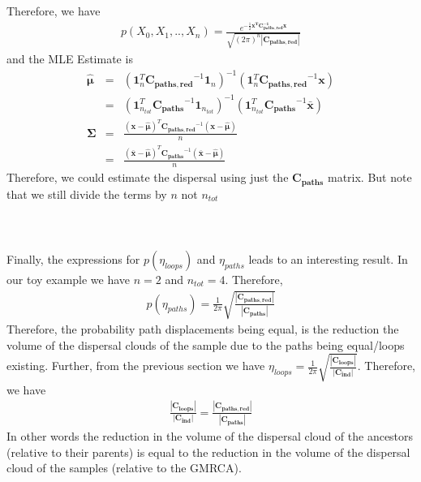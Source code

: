 Therefore, we have 
\begin{eqnarray*}
    p(X_0,X_1,..,X_n) = \frac{e^{ -\frac{1}{2} \mathbf{x^TC_{paths,red}^{-1}x} }}{\sqrt{(2\pi)^n |\mathbf{C_{paths,red}}| }}
\end{eqnarray*}
and the MLE Estimate is 
\begin{eqnarray*}
\boldsymbol{\hat{\mu}} &=& (\mathbf{1}_n^T\mathbf{C_{paths,red}}^{-1}\mathbf{1}_n)^{-1} ( \mathbf{1}_n^T\mathbf{C_{paths,red}}^{-1}\mathbf{x} ) \\ &=& (\mathbf{1}_{n_{tot}}^T\mathbf{C_{paths}}^{-1}\mathbf{1}_{n_{tot}})^{-1} ( \mathbf{1}_{n_{tot}}^T\mathbf{C_{paths}}^{-1}\mathbf{\bar{x}} )  \\
\boldsymbol{\Sigma} &=& \frac{(\mathbf{x} - \boldsymbol{\hat{\mu}} )^T \mathbf{C_{paths,red}}^{-1} (\mathbf{x} - \boldsymbol{\hat{\mu}} )}{n} \\
&=& \frac{(\mathbf{\bar{x}} - \boldsymbol{\hat{\mu}} )^T \mathbf{C_{paths}}^{-1} (\mathbf{\bar{x}} - \boldsymbol{\hat{\mu}} )}{n}
\end{eqnarray*}
Therefore, we could estimate the dispersal using just the $\mathbf{C_{paths}}$ matrix. But note that we still divide the terms by $n$ not $n_{tot}$ \\ \\ \\ \\
Finally, the expressions for $p(\eta_{loops})$ and $\eta_{paths}$ leads to an interesting result.  In our toy example we have $n=2$ and $n_{tot} =4$. Therefore, 
\begin{eqnarray*}
    p(\eta_{paths}) = \frac{1}{2\pi} \sqrt{\frac{|\mathbf{C_{paths,red}}|}{|\mathbf{C_{paths}}|}}
\end{eqnarray*}
Therefore, the probability path displacements being equal, is the reduction the volume of the dispersal clouds of the sample due to the paths being equal/loops existing. Further, from the previous section we have $\eta_{loops} = \frac{1}{2\pi} \sqrt{\frac{ |\mathbf{C_{loops}}| }{ |\mathbf{C_{ind}}| } }$. Therefore, we have 
\begin{eqnarray}
    \frac{ |\mathbf{C_{loops}}| }{ |\mathbf{C_{ind}}| }  = \frac{|\mathbf{C_{paths,red}}|}{|\mathbf{C_{paths}}|}
\end{eqnarray}
In other words the reduction in the volume of the dispersal cloud of the ancestors (relative to their parents) is equal to the reduction in the volume of the dispersal cloud of the samples (relative to the GMRCA).


